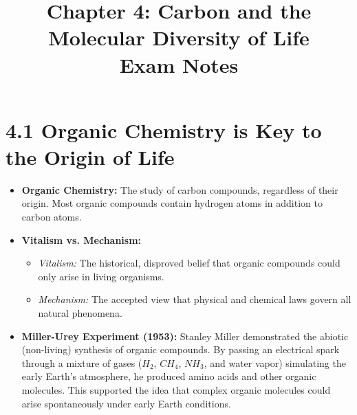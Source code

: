 \documentclass[11pt, a4paper]{article}
\title{\textbf{Chapter 4: Carbon and the Molecular Diversity of Life \\ Exam Notes}}
\author{}
\date{}
\begin{document}
\maketitle

\section*{4.1 Organic Chemistry is Key to the Origin of Life}
\begin{itemize}
    \item \textbf{Organic Chemistry:} The study of carbon compounds, regardless of their origin. Most organic compounds contain hydrogen atoms in addition to carbon atoms.
    \item \textbf{Vitalism vs. Mechanism:} 
    \begin{itemize}
        \item \textit{Vitalism:} The historical, disproved belief that organic compounds could only arise in living organisms.
        \item \textit{Mechanism:} The accepted view that physical and chemical laws govern all natural phenomena. 
    \end{itemize}
    \item \textbf{Miller-Urey Experiment (1953):} Stanley Miller demonstrated the abiotic (non-living) synthesis of organic compounds. By passing an electrical spark through a mixture of gases ($H_2$, $CH_4$, $NH_3$, and water vapor) simulating the early Earth's atmosphere, he produced amino acids and other organic molecules. This supported the idea that complex organic molecules could arise spontaneously under early Earth conditions.
\end{itemize}
\end{document}
